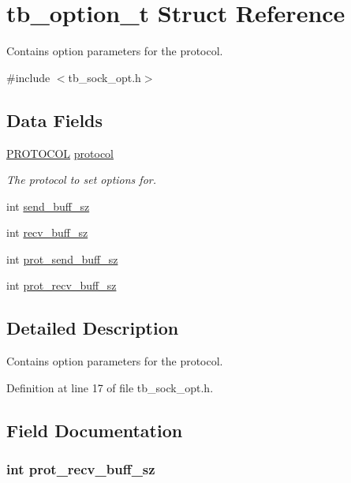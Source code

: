 \hypertarget{structtb__option__t}{\section{tb\-\_\-option\-\_\-t Struct Reference}
\label{structtb__option__t}
}


Contains option parameters for the protocol.  




{\ttfamily \#include $<$tb\-\_\-sock\-\_\-opt.\-h$>$}

\subsection*{Data Fields}
\begin{DoxyCompactItemize}
\item 
\hyperlink{tb__protocol_8h_a7a5bff1040fc154c510874327d44cc1a}{P\-R\-O\-T\-O\-C\-O\-L} \hyperlink{structtb__option__t_a0d2276cd987e688180eedab183cd503e}{protocol}
\begin{DoxyCompactList}\small\item\em The protocol to set options for. \end{DoxyCompactList}\item 
int \hyperlink{structtb__option__t_af5339380e8b662fd25ed22b300026ee1}{send\-\_\-buff\-\_\-sz}
\item 
int \hyperlink{structtb__option__t_add6d14b73b59cd3d20c96e90a661c84e}{recv\-\_\-buff\-\_\-sz}
\item 
int \hyperlink{structtb__option__t_a1c242d6f62d995282dbeddfaac2a1890}{prot\-\_\-send\-\_\-buff\-\_\-sz}
\item 
int \hyperlink{structtb__option__t_ac30079a387e9871c4054c0fbbd3ea8ea}{prot\-\_\-recv\-\_\-buff\-\_\-sz}
\end{DoxyCompactItemize}


\subsection{Detailed Description}
Contains option parameters for the protocol. 

Definition at line 17 of file tb\-\_\-sock\-\_\-opt.\-h.



\subsection{Field Documentation}
\hypertarget{structtb__option__t_ac30079a387e9871c4054c0fbbd3ea8ea}{
\subsubsection[{prot\-\_\-recv\-\_\-buff\-\_\-sz}]{\setlength{\rightskip}{0pt plus 5cm}int prot\-\_\-recv\-\_\-buff\-\_\-sz}}\label{structtb__option__t_ac30079a387e9871c4054c0fbbd3ea8ea}



